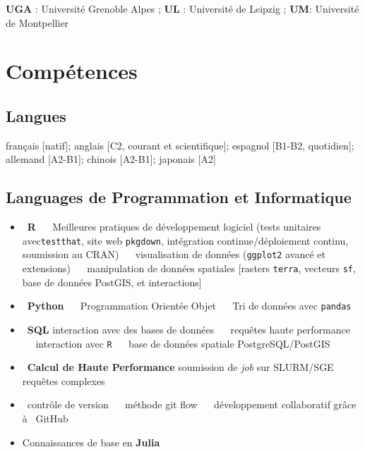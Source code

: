 \documentclass[10pt,a4paper,]{article}
\providecommand{\tightlist}{%
  \setlength{\itemsep}{0pt}\setlength{\parskip}{0pt}}
\begin{document}
\textbf{UGA} : Université Grenoble Alpes ; \textbf{UL} : Université de
Leipzig ; \textbf{UM}: Université de Montpellier

\section{Compétences}\label{compuxe9tences}

\subsection{Langues}\label{langues}

français {[}natif{]}; anglais {[}C2, courant et scientifique{]};
espagnol {[}B1-B2, quotidien{]}; allemand {[}A2-B1{]}; chinois
{[}A2-B1{]}; japonais {[}A2{]}

\subsection{Languages de Programmation et
Informatique}\label{languages-de-programmation-et-informatique}

\begin{itemize}
\tightlist
\item
  \faRProject~\textbf{R} ~\textbullet~ Meilleures pratiques de
  développement logiciel (tests unitaires avec\texttt{testthat}, site
  web \texttt{pkgdown}, intégration continue/déploiement continu,
  soumission au CRAN) ~\textbullet~ visualisation de données
  (\texttt{ggplot2} avancé et extensions) ~\textbullet~ manipulation de
  données spatiales {[}rasters \texttt{terra}, vecteurs \texttt{sf},
  base de données PostGIS, et interactions{]}
\item
  \faPython~\textbf{Python} ~\textbullet~ Programmation Orientée Objet
  ~\textbullet~ Tri de données avec \texttt{pandas}
\item
  \faDatabase~\textbf{SQL} interaction avec des bases de données
  ~\textbullet~ requêtes haute performance ~\textbullet~ interaction
  avec \texttt{R} ~\textbullet~ base de données spatiale
  PostgreSQL/PostGIS
\item
  \faServer~\textbf{Calcul de Haute Performance} soumission de
  \emph{job} sur SLURM/SGE ~\textbullet~ requêtes complexes
\item
  \faGit~contrôle de version ~\textbullet~ méthode git flow
  ~\textbullet~ développement collaboratif grâce à \faGithub~GitHub
\item
  Connaissances de base en \textbf{Julia}
\end{itemize}
\end{document}
